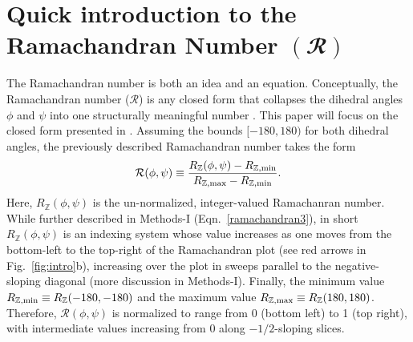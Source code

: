 \documentclass[fleqn,10pt]{wlpeerj} %
\newcommand{\round}[1]{\left \lfloor #1 \right \rceil }
\newcommand{\Fig}[1]{Fig.~\ref{#1}}
\newcommand{\Eqn}[1]{Eqn.~\ref{#1}}
\begin{document}
\section*{Quick introduction to the Ramachandran Number $\bm{(\mathbfcal{R})}$}

The Ramachandran number is both an idea and an equation. Conceptually, the Ramachandran number ($\mathcal{R}$) is any closed form that collapses the dihedral angles $\phi$ and $\psi$ into one structurally meaningful number \citep{MannigeKunduWhitelam2016}. This paper will focus on the closed form presented in \cite{MannigeKunduWhitelam2016}. Assuming the bounds $[-180,180)$ for both dihedral angles, the previously described Ramachandran number takes the form 
\begin{equation}
\label{FirstRamachandran}
{\mathcal{R}}(\phi,\psi) \equiv  \frac{R_\mathbb{Z}(\phi,\psi)-R_{\mathbb{Z},\rm min}}{R_{\mathbb{Z},\rm max}-R_{\mathbb{Z},\rm min}}.
\end{equation}
Here, $R_\mathbb{Z}(\phi,\psi)$ is the un-normalized, integer-valued Ramachanran number. While further described in Methods-I (\Eqn{ramachandran3}), in short $R_\mathbb{Z}(\phi,\psi)$ is an indexing system whose value increases as one moves from the bottom-left to the top-right of the Ramachandran plot (see red arrows in \Fig{fig:intro}b), increasing over the plot in sweeps parallel to the negative-sloping diagonal (more discussion in Methods-I). 
Finally, the minimum value $R_{\mathbb{Z},\rm min}\equiv R_\mathbb{Z}(-180,-180)$ and the maximum value $R_{\mathbb{Z},\rm max}\equiv R_\mathbb{Z}(180,180)$. Therefore, ${\mathcal{R}}(\phi,\psi)$ is normalized to range from 0 (bottom left) to 1 (top right), with intermediate values increasing from 0 along $-1/2$-sloping slices.
\end{document}
